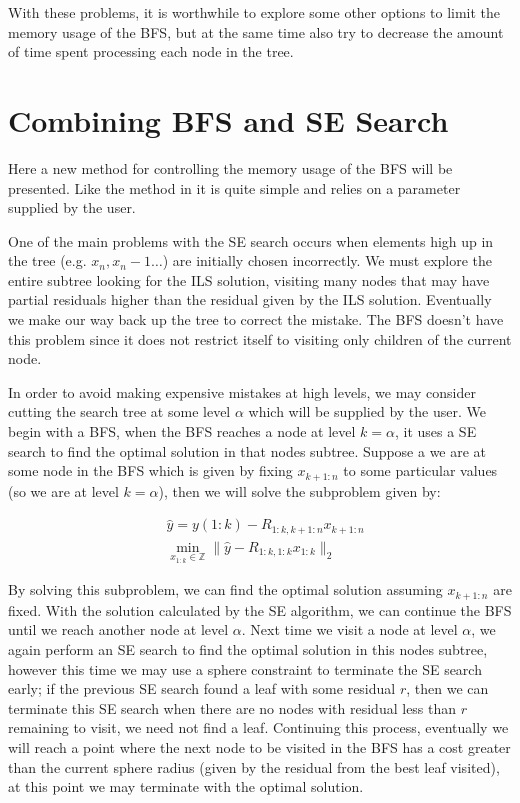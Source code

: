\documentclass[12pt,Bold,letterpaper]{mcgilletdclass}
\newcommand{\vsp}{\vspace{\baselineskip}}
\begin{document}
With these problems, it is worthwhile to explore some other options to limit the memory usage of the BFS, but at the same time also try to decrease the amount of time spent processing each node in the tree.

\vsp \section{Combining BFS and SE Search}

Here a new method for controlling the memory usage of the BFS will be presented. Like the method in \cite{StuBF07} it is quite simple and relies on a parameter supplied by the user.

One of the main problems with the SE search occurs when elements high up in the tree (e.g. $x_n, x_n-1 \dots$) are initially chosen incorrectly. We must explore the entire subtree looking for the ILS solution, visiting many nodes that may have partial residuals higher than the residual given by the ILS solution. Eventually we make our way back up the tree to correct the mistake. The BFS doesn't have this problem since it does not restrict itself to visiting only children of the current node.

In order to avoid making expensive mistakes at high levels, we may consider cutting the search tree at some level $\alpha$ which will be supplied by the user. We begin with a BFS, when the BFS reaches a node at level $k=\alpha$, it uses a SE search to find the optimal solution in that nodes subtree. Suppose a we are at some node in the BFS which is given by fixing $x_{k+1:n}$ to some particular values (so we are at level $k=\alpha$), then we will solve the subproblem  given by:

\begin{align} 
&\hat{y} = y(1:k) - R_{1:k,k+1:n}x_{k+1:n} \\
&\min_{x_{1:k} \in {\mathbb{Z} }}  \| \hat{y} - R_{1:k,1:k}x_{1:k} \|_2
\end{align}

By solving this subproblem, we can find the optimal solution assuming $x_{k+1:n}$ are fixed. With the solution calculated by the SE algorithm, we can continue the BFS until we reach another node at level $\alpha$. Next time we visit a node at level $\alpha$, we again perform an SE search to find the optimal solution in this nodes subtree, however this time we may use a sphere constraint to terminate the SE search early; if the previous SE search found a leaf with some residual $r$, then we can terminate this SE search when there are no nodes with residual less than $r$ remaining to visit, we need not find a leaf. Continuing this process, eventually we will reach a point where the next node to be visited in the BFS has a cost greater than the current sphere radius (given by the residual from the best leaf visited), at this point we may terminate with the optimal solution.
\end{document}
